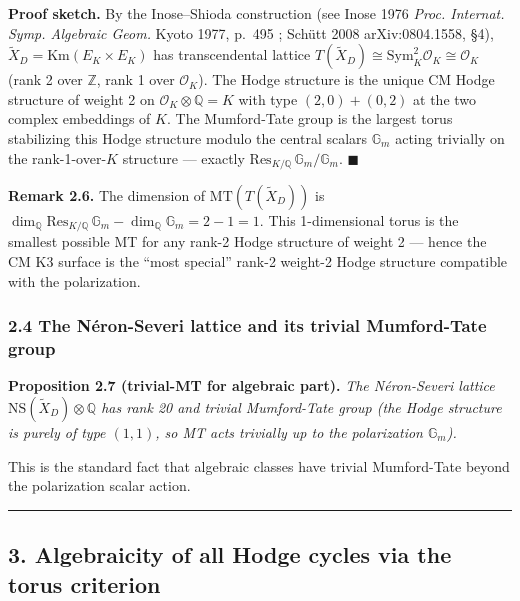\documentclass[
  11pt,
  a4paper,
]{article}
\begin{document}
\textbf{Proof sketch.} By the Inose--Shioda construction (see Inose 1976 \emph{Proc. Internat. Symp. Algebraic Geom.} Kyoto 1977, p.~495 ; Schütt 2008 arXiv:0804.1558, §4), \(\widetilde{X}_D = \mathrm{Km}(E_K \times E_K)\) has transcendental lattice \(T(\widetilde{X}_D) \cong \mathrm{Sym}^2_K \mathcal{O}_K \cong \mathcal{O}_K\) (rank 2 over \(\mathbb{Z}\), rank 1 over \(\mathcal{O}_K\)). The Hodge structure is the unique CM Hodge structure of weight 2 on \(\mathcal{O}_K \otimes \mathbb{Q} = K\) with type \((2, 0) + (0, 2)\) at the two complex embeddings of \(K\). The Mumford-Tate group is the largest torus stabilizing this Hodge structure modulo the central scalars \(\mathbb{G}_m\) acting trivially on the rank-1-over-\(K\) structure --- exactly \(\mathrm{Res}_{K/\mathbb{Q}}\,\mathbb{G}_m / \mathbb{G}_m\). \(\blacksquare\)

\textbf{Remark 2.6.} The dimension of \(\mathrm{MT}(T(\widetilde{X}_D))\) is \(\dim_\mathbb{Q} \mathrm{Res}_{K/\mathbb{Q}}\,\mathbb{G}_m - \dim_\mathbb{Q} \mathbb{G}_m = 2 - 1 = 1\). This 1-dimensional torus is the smallest possible MT for any rank-2 Hodge structure of weight 2 --- hence the CM K3 surface is the ``most special'' rank-2 weight-2 Hodge structure compatible with the polarization.

\hypertarget{the-nuxe9ron-severi-lattice-and-its-trivial-mumford-tate-group}{%
\subsubsection{2.4 The Néron-Severi lattice and its trivial Mumford-Tate group}\label{the-nuxe9ron-severi-lattice-and-its-trivial-mumford-tate-group}}

\textbf{Proposition 2.7 (trivial-MT for algebraic part).} \emph{The Néron-Severi lattice \(\mathrm{NS}(\widetilde{X}_D) \otimes \mathbb{Q}\) has rank 20 and trivial Mumford-Tate group (the Hodge structure is purely of type \((1, 1)\), so MT acts trivially up to the polarization \(\mathbb{G}_m\)).}

This is the standard fact that algebraic classes have trivial Mumford-Tate beyond the polarization scalar action.

\begin{center}\rule{0.5\linewidth}{0.5pt}\end{center}

\hypertarget{algebraicity-of-all-hodge-cycles-via-the-torus-criterion}{%
\subsection{3. Algebraicity of all Hodge cycles via the torus criterion}\label{algebraicity-of-all-hodge-cycles-via-the-torus-criterion}}
\end{document}
